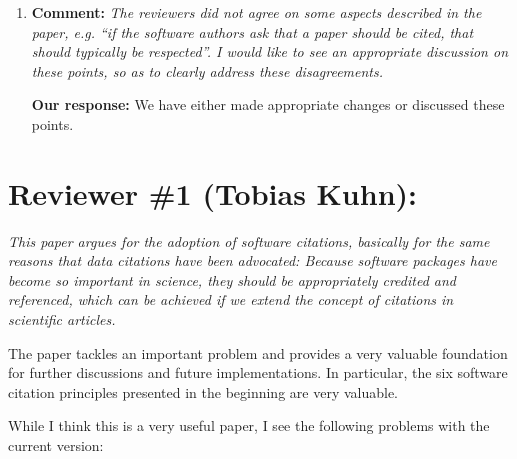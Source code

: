 \documentclass{article}
\newcommand{\katznote}[1]{ {\textcolor{blue} { ***DSK: #1 }}} %
\newcommand{\niemnote}[1]{ {\textcolor{orange} { ***KEN: #1 }}} %
\begin{document}
\begin{enumerate}
\textbf{Our response:}
\niemnote{I will add the full use cases text as an appendix, and revise to match the numbering in the table}
\niemnote{I will also add the FORCE16 comments and responses}

\niemnote{Dan \& Arfon: could you assist with adding descriptions to some of the use cases that don't have one?} \katznote{In both the Google doc and the appendix I think?}

\item \textbf{Comment:}
\emph{The reviewers did not agree on some aspects described in the paper, e.g. ``if the software authors ask that a paper should be cited, that should typically be respected''. I would like to see an appropriate discussion on these points, so as to clearly address these disagreements.}

\textbf{Our response:}
We have either made appropriate changes or discussed these points.


\end{enumerate}


\section*{Reviewer \#1 (Tobias Kuhn):}

{\itshape
This paper argues for the adoption of software citations, basically for the same reasons that data citations have been advocated: Because software packages have become so important in science, they should be appropriately credited and referenced, which can be achieved if we extend the concept of citations in scientific articles.

The paper tackles an important problem and provides a very valuable foundation for further discussions and future implementations. In particular, the six software citation principles presented in the beginning are very valuable.

While I think this is a very useful paper, I see the following problems with the current version:
}
\end{document}
